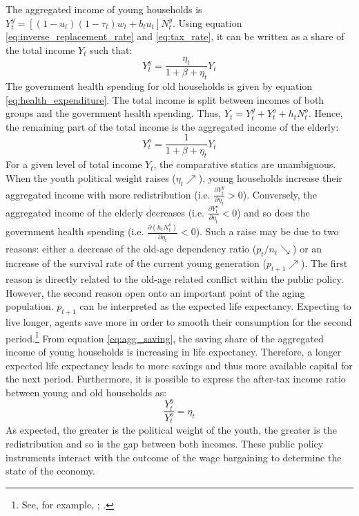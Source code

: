 The aggregated income of young households is $Y_t^y = \left[(1-u_t)(1-\tau_t)w_t+b_tu_t\right]N_t^y$. Using equation \eqref{eq:inverse_replacement_rate} and \eqref{eq:tax_rate}, it can be written as a share of the total income $Y_t$ such that:
	\begin{equation*}
	Y_t^y = \frac{\eta_t}{1+\beta+\eta_t} Y_t
	\end{equation*}
The government health spending for old households is given by equation \eqref{eq:health_expenditure}. The total income is split between incomes of both groups and the government health spending. Thus, $Y_t = Y_t^y + Y_t^o + h_tN_t^o$. Hence, the remaining part of the total income is the aggregated income of the elderly:
	\begin{equation*}
	Y_t^o = \frac{1}{1+\beta+\eta_t} Y_t
	\end{equation*}
For a given level of total income $Y_t$, the comparative statics are unambiguous. When the youth political weight raises ($\eta_t \nearrow$), young households increase their aggregated income with more redistribution (i.e. $\frac{\partial Y_t^y}{\partial \eta_t}>0$). Conversely, the aggregated income of the elderly decreases (i.e. $\frac{\partial Y_t^o}{\partial \eta_t}<0$) and so does the government health spending (i.e. $\frac{\partial(h_tN_t^o)}{\partial \eta_t}<0$). Such a raise may be due to two reasons: either a decrease of the old-age dependency ratio ($p_t/n_t \searrow$) or an increase of the survival rate of the current young generation ($p_{t+1} \nearrow$). The first reason is directly related to the old-age related conflict within the public policy. However, the second reason open onto an important point of the aging population. $p_{t+1}$ can be interpreted as the expected life expectancy. Expecting to live longer, agents save more in order to smooth their consumption for the second period.\footnote{See, for example, \cite{Bloom2003}; \cite{Zhang2005}.} From equation \eqref{eq:agg_saving}, the saving share of the aggregated income of young households is increasing in life expectancy. Therefore, a longer expected life expectancy leads to more savings and thus more available capital for the next period. Furthermore, it is possible to express the after-tax income ratio between young and old households as:
	\begin{equation} \label{eq:after_tax_income_ratio}
		\frac{Y_t^y}{Y_t^o} = \eta_t
	\end{equation}
As expected, the greater is the political weight of the youth, the greater is the redistribution and so is the gap between both incomes.
These public policy instruments interact with the outcome of the wage bargaining to determine the state of the economy.

